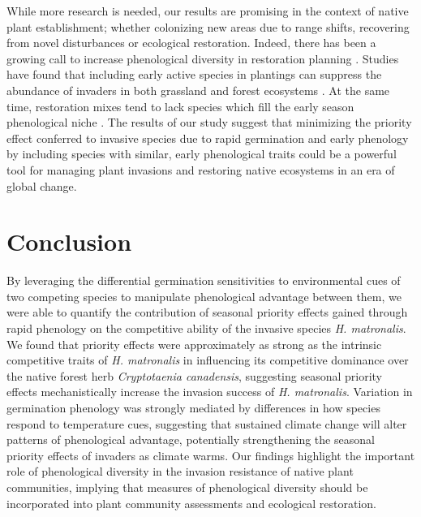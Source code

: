 \documentclass{article}[11pt]
\begin{document}
While more research is needed, our results are promising in the context of native plant establishment; whether colonizing new areas due to range shifts, recovering from novel disturbances or ecological restoration. Indeed, there has been a growing call to increase phenological diversity in restoration planning \citep{Hess:2019vn}. Studies have found that including early active species in plantings can suppress the abundance of invaders in both grassland \citep{Cleland:2013wo} and forest ecosystems \citep{Schuster:2020ww}. At the same time, restoration mixes tend to lack species which fill the early season phenological niche \citep{Havens:2016vo}. The results of our study suggest that minimizing the priority effect conferred to invasive species due to rapid germination and early phenology by including species with similar, early phenological traits could be a powerful tool for managing plant invasions and restoring native ecosystems in an era of global change.

\section*{Conclusion}
By leveraging the differential germination sensitivities to environmental cues of two competing species to manipulate phenological advantage between them, we were able to quantify the contribution of seasonal priority effects gained through rapid phenology on the competitive ability of the invasive species \textit{H. matronalis}. We found that priority effects were approximately as strong as the intrinsic competitive traits of \textit{H. matronalis} in influencing its competitive dominance over the native forest herb \textit{Cryptotaenia canadensis}, suggesting seasonal priority effects mechanistically increase the invasion success of \textit{H. matronalis}. Variation in germination phenology was strongly mediated by differences in how species respond to temperature cues, suggesting that sustained climate change will alter patterns of phenological advantage, potentially strengthening the seasonal priority effects of invaders as climate warms. Our findings highlight the important role of phenological diversity in the invasion resistance of native plant communities, implying that measures of phenological diversity should be incorporated into plant community assessments and ecological restoration. 
\end{document}
